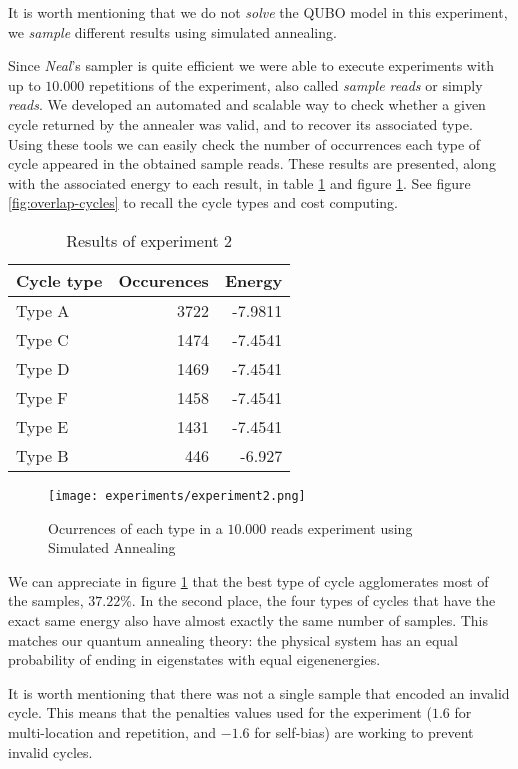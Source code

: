 It is worth mentioning that we do not \emph{solve} the QUBO model in this experiment, we \emph{sample} different results using simulated annealing.

Since \emph{Neal}'s sampler is quite efficient we were able to execute experiments with up to $10.000$ repetitions of the experiment, also called \emph{sample reads} or simply \emph{reads}. We developed an automated and scalable way to check whether a given cycle returned by the annealer was valid, and to recover its associated type. Using these tools we can easily check the number of occurrences each type of cycle appeared in the obtained sample reads. These results are presented, along with the associated energy to each result, in table \ref{tab:exp2} and figure \ref{fig:exp2-occ}. See figure \ref{fig:overlap-cycles} to recall the cycle types and cost computing.

\begin{table}[H]
	\centering
	\begin{tabular}{lrr}
		\textbf{Cycle type} & \textbf{Occurences} & \textbf{Energy} \\
		\hline
		Type A	& 3722	& -7.9811	\\
		Type C	& 1474	& -7.4541	\\
		Type D	& 1469	& -7.4541	\\
		Type F	& 1458	& -7.4541	\\
		Type E	& 1431	& -7.4541	\\
		Type B	& 446	& -6.927                             
	\end{tabular}
	\caption{Results of experiment 2}
	\label{tab:exp2}
\end{table}

\begin{figure}[H]
	\texttt{[image: experiments/experiment2.png]}
	\centering
	\caption{Ocurrences of each type in a $10.000$ reads experiment using Simulated Annealing}
	\label{fig:exp2-occ}
\end{figure}

We can appreciate in figure \ref{fig:exp2-occ} that the best type of cycle agglomerates most of the samples, $37.22\%$. In the second place, the four types of cycles that have the exact same energy also have almost exactly the same number of samples. This matches our quantum annealing theory: the physical system has an equal probability of ending in eigenstates with equal eigenenergies.

It is worth mentioning that there was not a single sample that encoded an invalid cycle. This means that the penalties values used for the experiment ($1.6$ for multi-location and repetition, and $-1.6$ for self-bias) are working to prevent invalid cycles.

